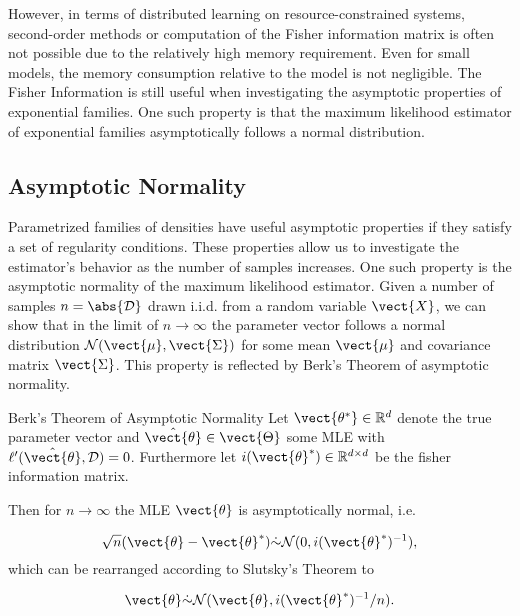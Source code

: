     However, in terms of distributed learning on resource-constrained systems, second-order methods or computation of the Fisher information matrix is often not possible due to the relatively high memory requirement.
    Even for small models, the memory consumption relative to the model is not negligible.
    The Fisher Information is still useful when investigating the asymptotic properties of exponential families. 
    One such property is that the maximum likelihood estimator of exponential families asymptotically follows a normal distribution.

    \subsection{Asymptotic Normality}
        \label{ssec:asymp}
        Parametrized families of densities have useful asymptotic properties if they satisfy a set of regularity conditions.
        These properties allow us to investigate the estimator's behavior as the number of samples increases. 
        One such property is the asymptotic normality of the maximum likelihood estimator.
        Given a number of samples $n = \abs{\mathcal{D}}$ drawn i.i.d. from a random variable $\vect{X}$, we can show that in the limit of $n \rightarrow \infty$ the parameter vector follows a normal distribution $\mathcal{N}(\vect{\mu}, \vect{\Sigma})$ for some mean $\vect{\mu}$ and covariance matrix $\vect{\Sigma}$. 
        This property is reflected by Berk's Theorem of asymptotic normality.


        \begin{threm}{Berk's Theorem of Asymptotic Normality\cite{berk1972consistency}}
            \label{theorem:berk}
            Let $\vect{\theta^*} \in \mathbb{R}^d$ denote the true parameter vector and $\hat{\vect{\theta}} \in \vect{\Theta}$ some MLE with $\ell'(\hat{\vect{\theta}}, \mathcal{D}) = 0$.
            Furthermore let $i(\vect{\theta}^*) \in \mathbb{R}^{d \times d}$ be the fisher information matrix.

            Then for $n \rightarrow \infty$ the MLE $\vect{\theta}$ is asymptotically normal, i.e.

            \begin{equation}
                \sqrt{n}(\vect{\theta} - \vect{\theta}^*) \dot{\sim} \mathcal{N}(0, i(\vect{\theta}^*)^{-1}),
            \end{equation}
            which can be rearranged according to Slutsky's Theorem\cite{casella2002statistical} to

            \begin{equation}
                \vect{\theta} \dot{\sim} \mathcal{N}(\vect{\theta}, i(\vect{\theta}^*)^{-1}/n).
            \end{equation}
        \end{threm}

